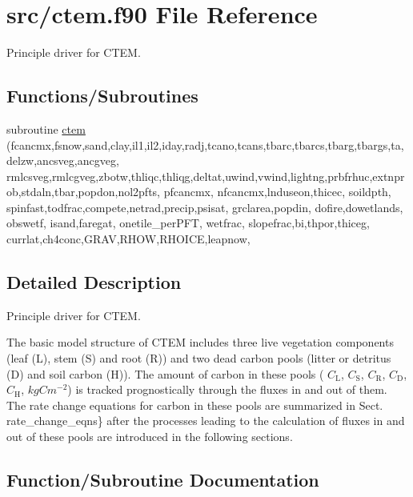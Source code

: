 \hypertarget{ctem_8f90}{}\section{src/ctem.f90 File Reference}
\label{ctem_8f90}


Principle driver for C\+T\+E\+M.  


\subsection*{Functions/\+Subroutines}
\begin{DoxyCompactItemize}
\item 
subroutine \hyperlink{ctem_8f90_ace1598599f37c24cac37dd963f23b497}{ctem} (fcancmx,fsnow,sand,clay,il1,il2,iday,radj,tcano,tcans,tbarc,tbarcs,tbarg,tbargs,ta,delzw,ancsveg,ancgveg, rmlcsveg,rmlcgveg,zbotw,thliqc,thliqg,deltat,uwind,vwind,lightng,prbfrhuc,extnprob,stdaln,tbar,popdon,nol2pfts, pfcancmx, nfcancmx,lnduseon,thicec, soildpth, spinfast,todfrac,compete,netrad,precip,psisat, grclarea,popdin, dofire,dowetlands, obswetf, isand,faregat, onetile\+\_\+per\+P\+F\+T, wetfrac, slopefrac,bi,thpor,thiceg, currlat,ch4conc,G\+R\+A\+V,R\+H\+O\+W,R\+H\+O\+I\+C\+E,leapnow,
\end{DoxyCompactItemize}


\subsection{Detailed Description}
Principle driver for C\+T\+E\+M. 

The basic model structure of C\+T\+E\+M includes three live vegetation components (leaf (L), stem (S) and root (R)) and two dead carbon pools (litter or detritus (D) and soil carbon (H)). The amount of carbon in these pools ( $C_\mathrm{L}$, $C_\mathrm{S}$, $C_\mathrm{R}$, $C_\mathrm{D}$, $C_\mathrm{H}$, $kgC m^{-2}$) is tracked prognostically through the fluxes in and out of them. The rate change equations for carbon in these pools are summarized in Sect. rate\+\_\+change\+\_\+eqns\} after the processes leading to the calculation of fluxes in and out of these pools are introduced in the following sections. 

\subsection{Function/\+Subroutine Documentation}
\hypertarget{ctem_8f90_ace1598599f37c24cac37dd963f23b497}{}
